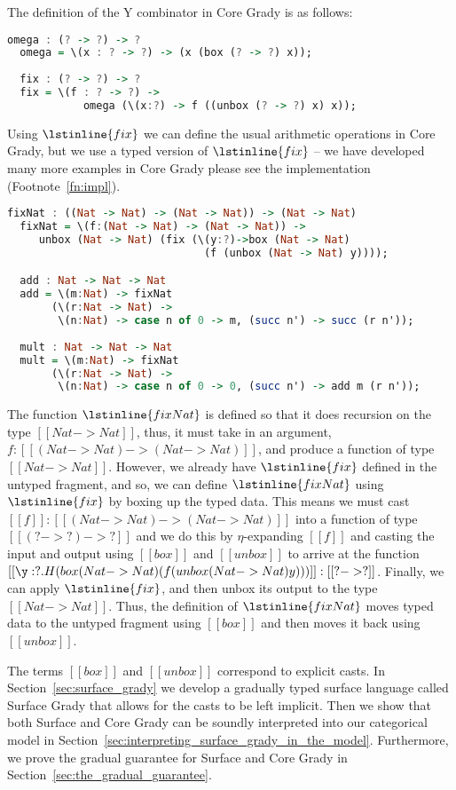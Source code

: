 The definition of the Y combinator in Core Grady is as follows:
\begin{lstlisting}[language=Haskell]
  omega : (? -> ?) -> ?
  omega = \(x : ? -> ?) -> (x (box (? -> ?) x));
  
  fix : (? -> ?) -> ?
  fix = \(f : ? -> ?) ->
            omega (\(x:?) -> f ((unbox (? -> ?) x) x));
\end{lstlisting}
Using $\lstinline{fix}$ we can define the usual arithmetic operations
in Core Grady, but we use a typed version of $\lstinline{fix}$ -- we
have developed many more examples in Core Grady please see the
implementation (Footnote~\ref{fn:impl}).
\begin{lstlisting}[language=Haskell]
  fixNat : ((Nat -> Nat) -> (Nat -> Nat)) -> (Nat -> Nat)
  fixNat = \(f:(Nat -> Nat) -> (Nat -> Nat)) ->
     unbox (Nat -> Nat) (fix (\(y:?)->box (Nat -> Nat) 
                               (f (unbox (Nat -> Nat) y))));

  add : Nat -> Nat -> Nat
  add = \(m:Nat) -> fixNat
       (\(r:Nat -> Nat) ->
        \(n:Nat) -> case n of 0 -> m, (succ n') -> succ (r n'));
        
  mult : Nat -> Nat -> Nat
  mult = \(m:Nat) -> fixNat
       (\(r:Nat -> Nat) ->
        \(n:Nat) -> case n of 0 -> 0, (succ n') -> add m (r n'));
\end{lstlisting}
The function $\lstinline{fixNat}$ is defined so that it does recursion
on the type $[[Nat -> Nat]]$, thus, it must take in an argument,
$f : [[(Nat -> Nat) -> (Nat -> Nat)]]$, and
produce a function of type $[[Nat -> Nat]]$.  However, we
already have $\lstinline{fix}$ defined in the untyped fragment, and
so, we can define $\lstinline{fixNat}$ using $\lstinline{fix}$ by
boxing up the typed data.  This means we must cast $[[f]] : [[(Nat -> Nat) -> (Nat -> Nat)]]$ into a function of type
$[[(? -> ?) -> ?]]$ and we do this by $\eta$-expanding
$[[f]]$ and casting the input and output using $[[box]]$ and
$[[unbox]]$ to arrive at the function
$[[\y:?.H(box (Nat -> Nat) (f (unbox (Nat -> Nat) y)))]] : [[? -> ?]]$.  Finally, we can apply $\lstinline{fix}$, and then unbox its output to the type $[[Nat -> Nat]]$.
Thus, the definition of $\lstinline{fixNat}$ moves typed data to the
untyped fragment using $[[box]]$ and then moves it back using
$[[unbox]]$.

The terms $[[box]]$ and $[[unbox]]$ correspond to explicit casts.  In
Section~\ref{sec:surface_grady} we develop a gradually typed surface
language called Surface Grady that allows for the casts to be left
implicit.  Then we show that both Surface and Core Grady can be
soundly interpreted into our categorical model in
Section~\ref{sec:interpreting_surface_grady_in_the_model}.
Furthermore, we prove the gradual guarantee for Surface and Core Grady
in Section~\ref{sec:the_gradual_guarantee}.

